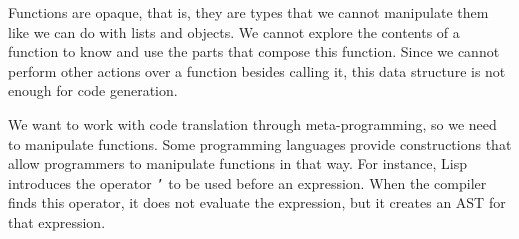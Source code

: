 \documentclass[english]{llncs}
\begin{document}



Functions are opaque, that is, they are types that we cannot manipulate them
like we can do with lists and objects.
We cannot explore the contents of a function to know and use the parts that
compose this function.
Since we cannot perform other actions over a function besides calling it,
this data structure is not enough for code generation.


We want to work with code translation through meta-programming, so
we need to manipulate functions.
Some programming languages provide constructions that allow programmers
to manipulate functions in that way.
For instance, Lisp \cite{McCarthy1960RFS} introduces the operator \texttt{'}
to be used before an expression.
When the compiler finds this operator, it does not evaluate the expression,
but it creates an AST for that expression.
\end{document}
